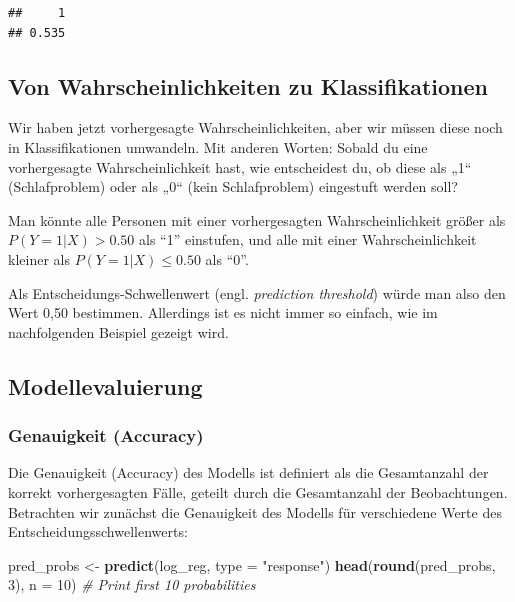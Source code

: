 \documentclass[
]{article}
\newenvironment{Shaded}{\begin{snugshade}}{\end{snugshade}}
\newcommand{\AttributeTok}[1]{\textcolor[rgb]{0.13,0.29,0.53}{#1}}
\newcommand{\CommentTok}[1]{\textcolor[rgb]{0.56,0.35,0.01}{\textit{#1}}}
\newcommand{\DecValTok}[1]{\textcolor[rgb]{0.00,0.00,0.81}{#1}}
\newcommand{\FunctionTok}[1]{\textcolor[rgb]{0.13,0.29,0.53}{\textbf{#1}}}
\newcommand{\NormalTok}[1]{#1}
\newcommand{\OtherTok}[1]{\textcolor[rgb]{0.56,0.35,0.01}{#1}}
\newcommand{\StringTok}[1]{\textcolor[rgb]{0.31,0.60,0.02}{#1}}
\begin{document}
\begin{verbatim}
##     1 
## 0.535
\end{verbatim}

\subsection{Von Wahrscheinlichkeiten zu Klassifikationen}\label{von-wahrscheinlichkeiten-zu-klassifikationen}

Wir haben jetzt vorhergesagte Wahrscheinlichkeiten, aber wir müssen diese noch in Klassifikationen umwandeln. Mit anderen Worten: Sobald du eine vorhergesagte Wahrscheinlichkeit hast, wie entscheidest du, ob diese als „1`` (Schlafproblem) oder als „0`` (kein Schlafproblem) eingestuft werden soll?

Man könnte alle Personen mit einer vorhergesagten Wahrscheinlichkeit größer als \(P(Y=1|X) > 0.50\) als ``1'' einstufen, und alle mit einer Wahrscheinlichkeit kleiner als \(P(Y=1|X) \leq 0.50\) als ``0''.

Als Entscheidungs-Schwellenwert (engl. \emph{prediction threshold}) würde man also den Wert 0,50 bestimmen. Allerdings ist es nicht immer so einfach, wie im nachfolgenden Beispiel gezeigt wird.

\subsection{Modellevaluierung}\label{modellevaluierung}

\subsubsection{Genauigkeit (Accuracy)}\label{genauigkeit-accuracy-1}

Die Genauigkeit (Accuracy) des Modells ist definiert als die Gesamtanzahl der korrekt vorhergesagten Fälle, geteilt durch die Gesamtanzahl der Beobachtungen. Betrachten wir zunächst die Genauigkeit des Modells für verschiedene Werte des Entscheidungsschwellenwerts:

\begin{Shaded}
\begin{Highlighting}[]
\NormalTok{  pred\_probs }\OtherTok{\textless{}{-}} \FunctionTok{predict}\NormalTok{(log\_reg, }\AttributeTok{type =} \StringTok{"response"}\NormalTok{)}
  \FunctionTok{head}\NormalTok{(}\FunctionTok{round}\NormalTok{(pred\_probs, }\DecValTok{3}\NormalTok{), }\AttributeTok{n =} \DecValTok{10}\NormalTok{) }\CommentTok{\# Print first 10 probabilities}
\end{Highlighting}
\end{Shaded}
\end{document}
